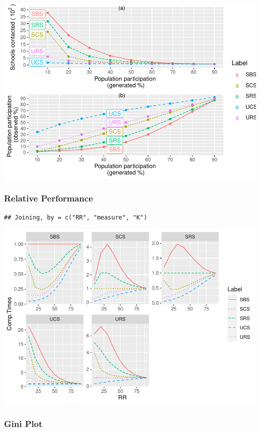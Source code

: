 \documentclass[
  english,
  man,floatsintext]{apa6}
\begin{document}
\includegraphics{5---Analysis_files/figure-latex/unnamed-chunk-32-1.pdf}

\hypertarget{relative-performance}{%
\subsubsection{Relative Performance}\label{relative-performance}}

\begin{verbatim}
## Joining, by = c("RR", "measure", "K")
\end{verbatim}

\includegraphics{5---Analysis_files/figure-latex/unnamed-chunk-33-1.pdf}

\hypertarget{gini-plot}{%
\subsubsection{Gini Plot}\label{gini-plot}}
\end{document}

